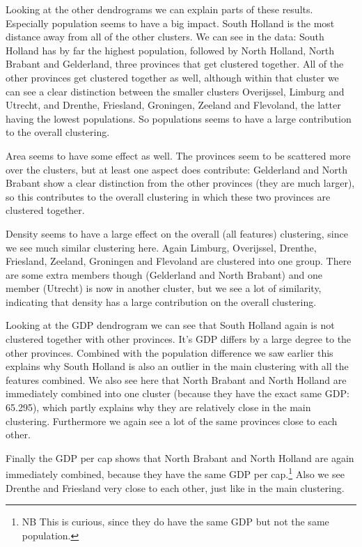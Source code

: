 \documentclass[10pt]{article}
\begin{document}
Looking at the other dendrograms we can explain parts of these results. Especially population seems to have a big impact. South Holland is the most distance away from all of the other clusters. We can see in the data: South Holland has by far the highest population, followed by North Holland, North Brabant and Gelderland, three provinces that get clustered together. All of the other provinces get clustered together as well, although within that cluster we can see a clear distinction between the smaller clusters Overijssel, Limburg and Utrecht, and Drenthe, Friesland, Groningen, Zeeland and Flevoland, the latter having the lowest populations. So populations seems to have a large contribution to the overall clustering.

Area seems to have some effect as well. The provinces seem to be scattered more over the clusters, but at least one aspect does contribute: Gelderland and North Brabant show a clear distinction from the other provinces (they are much larger), so this contributes to the overall clustering in which these two provinces are clustered together. 

Density seems to have a large effect on the overall (all features) clustering, since we see much similar clustering here. Again Limburg, Overijssel, Drenthe, Friesland, Zeeland, Groningen and Flevoland are clustered into one group. There are some extra members though (Gelderland and North Brabant) and one member (Utrecht) is now in another cluster, but we see a lot of similarity, indicating that density has a large contribution on the overall clustering. 

Looking at the GDP dendrogram we can see that South Holland again is not clustered together with other provinces. It's GDP differs by a large degree to the other provinces. Combined with the population difference we saw earlier this explains why South Holland is also an outlier in the main clustering with all the features combined. We also see here that North Brabant and North Holland are immediately combined into one cluster (because they have the exact same GDP: 65.295), which partly explains why they are relatively close in the main clustering. Furthermore we again see a lot of the same provinces close to each other.

Finally the GDP per cap shows that North Brabant and North Holland are again immediately combined, because they have the same GDP per cap.\footnote{NB This is curious, since they do have the same GDP but not the same population.} Also we see Drenthe and Friesland very close to each other, just like in the main clustering.
\end{document}
